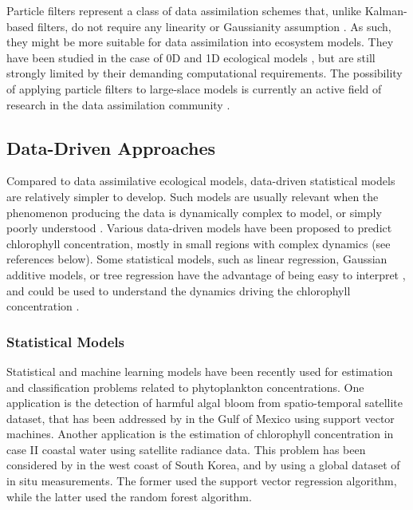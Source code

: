 Particle filters represent a class of data assimilation schemes that, unlike
Kalman-based filters, do not require any linearity or Gaussianity assumption
\citep{Edwards2015}. As such, they might be more suitable for data assimilation
into ecosystem models. They have been studied in the case of 0D and 1D
ecological models \citep{Edwards2015}, but are still strongly limited by their
demanding computational requirements. The possibility of applying particle
filters to large-slace models is currently an active field of research in the
data assimilation community \citep{Edwards2015}.


\subsection{Data-Driven Approaches}

Compared to data assimilative ecological models, data-driven statistical models
are relatively simpler to develop. Such models are usually
relevant when the phenomenon
producing the data is dynamically complex to model, or simply poorly understood
\citep{Gareth2013}. Various data-driven models have been proposed
to predict chlorophyll
concentration, mostly in small regions with complex dynamics (see references
below). Some statistical models, such as linear regression, Gaussian additive
models, or tree regression have the advantage of being easy to interpret
\citep{Gareth2013}, and could be used to understand the dynamics driving the
chlorophyll concentration \citep{Raitsos2012}.

\subsubsection{Statistical Models}

Statistical and machine learning models have been recently used for estimation and
classification problems related to phytoplankton concentrations. One
application is the detection of harmful algal bloom from spatio-temporal
satellite dataset, that has been addressed by \citet{Gokaraju2011} in the Gulf
of Mexico using support vector machines. Another application is the estimation
of chlorophyll concentration in case II coastal water using satellite radiance
data. This problem has been considered by \citet{Kim2014} in the west coast of
South Korea, and by \citet{Camps-Valls2006} using a global dataset of in situ
measurements.  The former used the support vector regression algorithm, while
the latter used the random forest algorithm.


